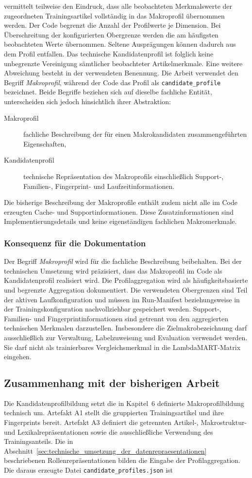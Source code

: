 vermittelt teilweise den Eindruck, dass alle beobachteten Merkmalswerte der zugeordneten Trainingsartikel vollständig in das Makroprofil übernommen werden. Der Code begrenzt die Anzahl der Profilwerte je Dimension. Bei Überschreitung der konfigurierten Obergrenze werden die am häufigsten beobachteten Werte übernommen. Seltene Ausprägungen können dadurch aus dem Profil entfallen. Das technische Kandidatenprofil ist folglich keine unbegrenzte Vereinigung sämtlicher beobachteter Artikelmerkmale. Eine weitere Abweichung besteht in der verwendeten Benennung. Die Arbeit verwendet den Begriff \textit{Makroprofil}, während der Code das Profil als \texttt{candidate\_profile} bezeichnet. Beide Begriffe beziehen sich auf dieselbe fachliche Entität, unterscheiden sich jedoch hinsichtlich ihrer Abstraktion: \begin{description} \item[Makroprofil] fachliche Beschreibung der für einen Makrokandidaten zusammengeführten Eigenschaften, \item[Kandidatenprofil] technische Repräsentation des Makroprofils einschließlich Support-, Familien-, Fingerprint- und Laufzeitinformationen. \end{description} Die bisherige Beschreibung der Makroprofile enthält zudem nicht alle im Code erzeugten Cache- und Supportinformationen. Diese Zusatzinformationen sind Implementierungsdetails und keine eigenständigen fachlichen Makromerkmale. \subsubsection*{Konsequenz für die Dokumentation} Der Begriff \textit{Makroprofil} wird für die fachliche Beschreibung beibehalten. Bei der technischen Umsetzung wird präzisiert, dass das Makroprofil im Code als Kandidatenprofil realisiert wird. Die Profilaggregation wird als häufigkeitsbasierte und begrenzte Aggregation dokumentiert. Die verwendeten Obergrenzen sind Teil der aktiven Laufkonfiguration und müssen im Run-Manifest beziehungsweise in der Trainingskonfiguration nachvollziehbar gespeichert werden. Support-, Familien- und Fingerprintinformationen sind getrennt von den aggregierten technischen Merkmalen darzustellen. Insbesondere die Zielmakrobezeichnung darf ausschließlich zur Verwaltung, Labelzuweisung und Evaluation verwendet werden. Sie darf nicht als trainierbares Vergleichsmerkmal in die LambdaMART-Matrix eingehen. \subsection{Zusammenhang mit der bisherigen Arbeit} \label{subsec:zusammenhang_kandidatenprofile} Die Kandidatenprofilbildung setzt die in Kapitel~6 definierte Makroprofilbildung technisch um. Artefakt A1 stellt die gruppierten Trainingsartikel und ihre Fingerprints bereit. Artefakt A3 definiert die getrennten Artikel-, Makrostruktur- und Lexikalrepräsentationen sowie die ausschließliche Verwendung des Trainingsanteils. Die in Abschnitt~\ref{sec:technische_umsetzung_der_datenrepraesentationen} beschriebenen Rollenrepräsentationen bilden die Eingabe der Profilaggregation. Die daraus erzeugte Datei \texttt{candidate\_profiles.json} ist 